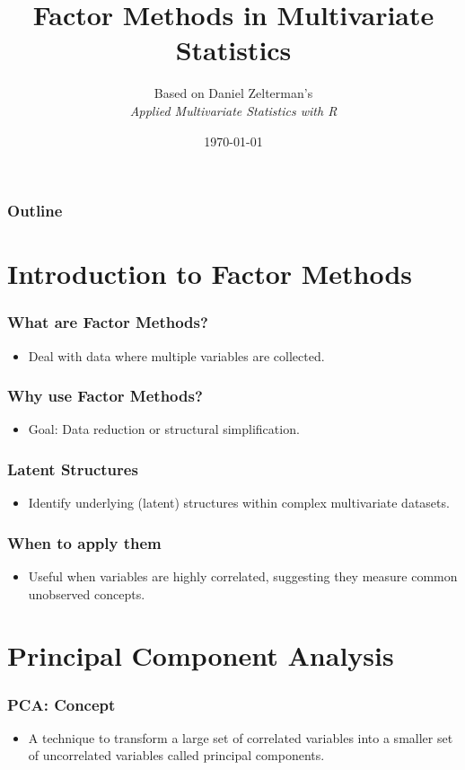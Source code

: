 \documentclass{beamer}
\title{Factor Methods in Multivariate Statistics}
\author{Based on Daniel Zelterman's \\ \textit{Applied Multivariate Statistics with R}}
\date{\today}
\begin{document}
\frame{\titlepage}

\begin{frame}
    \frametitle{Outline}
    \tableofcontents
\end{frame}

\section{Introduction to Factor Methods}

\begin{frame}
    \frametitle{What are Factor Methods?}
    \begin{itemize}
        \item Deal with data where multiple variables are collected.
    \end{itemize}
\end{frame}

\begin{frame}
    \frametitle{Why use Factor Methods?}
    \begin{itemize}
        \item Goal: \alert{Data reduction} or \alert{structural simplification}.
    \end{itemize}
\end{frame}

\begin{frame}
    \frametitle{Latent Structures}
    \begin{itemize}
        \item Identify underlying (latent) structures within complex multivariate datasets.
    \end{itemize}
\end{frame}

\begin{frame}
    \frametitle{When to apply them}
    \begin{itemize}
        \item Useful when variables are highly correlated, suggesting they measure common unobserved concepts.
    \end{itemize}
\end{frame}

\section{Principal Component Analysis}

\begin{frame}
    \frametitle{PCA: Concept}
    \begin{itemize}
        \item A technique to transform a large set of correlated variables into a smaller set of uncorrelated variables called \alert{principal components}.
    \end{itemize}
\end{frame}
\end{document}
